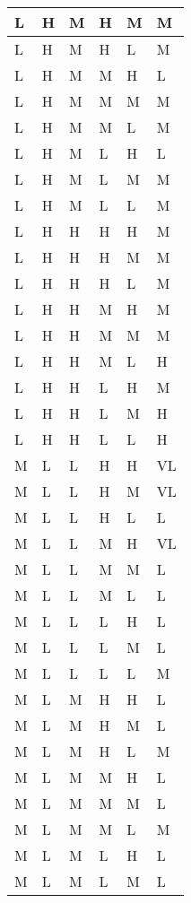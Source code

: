 \begin{center}
\begin{longtable}{| l | l | l | l | l | l |}
    L & H & M & H & M & M \\ \hline 
    L & H & M & H & L & M \\ \hline 
    L & H & M & M & H & L \\ \hline 
    L & H & M & M & M & M \\ \hline 
    L & H & M & M & L & M \\ \hline 
    L & H & M & L & H & L \\ \hline 
    L & H & M & L & M & M \\ \hline 
    L & H & M & L & L & M \\ \hline 
    L & H & H & H & H & M \\ \hline 
    L & H & H & H & M & M \\ \hline 
    L & H & H & H & L & M \\ \hline 
    L & H & H & M & H & M \\ \hline 
    L & H & H & M & M & M \\ \hline 
    L & H & H & M & L & H \\ \hline 
    L & H & H & L & H & M \\ \hline 
    L & H & H & L & M & H \\ \hline 
    L & H & H & L & L & H \\ \hline 
    M & L & L & H & H & VL \\ \hline 
    M & L & L & H & M & VL \\ \hline 
    M & L & L & H & L & L \\ \hline 
    M & L & L & M & H & VL \\ \hline 
    M & L & L & M & M & L \\ \hline 
    M & L & L & M & L & L \\ \hline 
    M & L & L & L & H & L \\ \hline 
    M & L & L & L & M & L \\ \hline 
    M & L & L & L & L & M \\ \hline 
    M & L & M & H & H & L \\ \hline 
    M & L & M & H & M & L \\ \hline 
    M & L & M & H & L & M \\ \hline 
    M & L & M & M & H & L \\ \hline 
    M & L & M & M & M & L \\ \hline 
    M & L & M & M & L & M \\ \hline 
    M & L & M & L & H & L \\ \hline 
    M & L & M & L & M & L \\ \hline 

\end{longtable}
\end{center}
